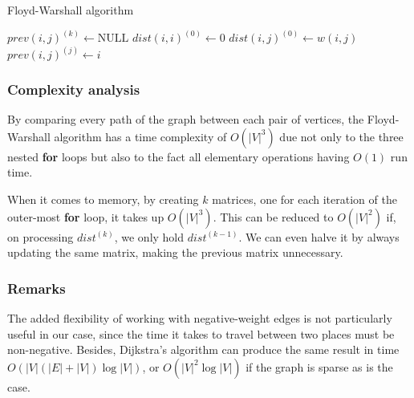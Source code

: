 \begin{algorithm}[ht]
    \caption{Floyd-Warshall algorithm}
    \label{alg:floyd-warshall}
    \begin{algorithmic}[1]
             
                 {$prev(i,j)^{(k)} \gets \text{NULL}$}
                \EndFor
            \EndFor
             $dist(i,i)^{(0)} \gets 0$
            \EndFor
             
                \State $dist(i,j)^{(0)} \gets w(i,j)$
                \State $prev(i,j)^{(j)} \gets i$
            \EndFor
             
                    \EndIf
                \EndFor
            \EndFor
            \State {}
        \EndFunction
    \end{algorithmic}
\end{algorithm}

\subsubsection{Complexity analysis}
By comparing every path of the graph between each pair of vertices, the Floyd-Warshall algorithm has a time complexity of $O(|V|^3)$ due not only to the three nested \textbf{for} loops but also to the fact all elementary operations having $O(1)$ run time.\par
When it comes to memory, by creating $k$ matrices, one for each iteration of the outer-most \textbf{for} loop, it takes up $O(|V|^3)$. This can be reduced to $O(|V|^2)$ if, on processing $dist^{(k)}$, we only hold $dist^{(k-1)}$. We can even halve it by always updating the same matrix, making the previous matrix unnecessary.

\subsubsection{Remarks}
The added flexibility of working with negative-weight edges is not particularly useful in our case, since the time it takes to travel between two places must be non-negative. Besides, Dijkstra's algorithm can produce the same result in time $O(|V|(|E|+|V|)\log {|V|})$, or $O(|V|^2 \log |V|)$ if the graph is sparse as is the case.